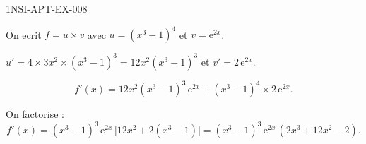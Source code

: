 \begin{corrige}{1NSI-APT-EX-008}

On ecrit $f = u \times v$ avec $u = (x^3-1)^4$ et $v = \mathrm{e}^{2x}$.


$u' = 4 \times 3x^2 \times (x^3-1)^3 = 12x^2(x^3-1)^3$ et $v' = 2\,\mathrm{e}^{2x}$.

\[ f'(x) = 12x^2(x^3-1)^3\,\mathrm{e}^{2x} + (x^3-1)^4 \times 2\,\mathrm{e}^{2x}. \]

On factorise :
\[ f'(x) = (x^3-1)^3\,\mathrm{e}^{2x}\,\bigl[12x^2 + 2(x^3-1)\bigr] = (x^3-1)^3\,\mathrm{e}^{2x}\,(2x^3+12x^2-2). \]

\end{corrige}
